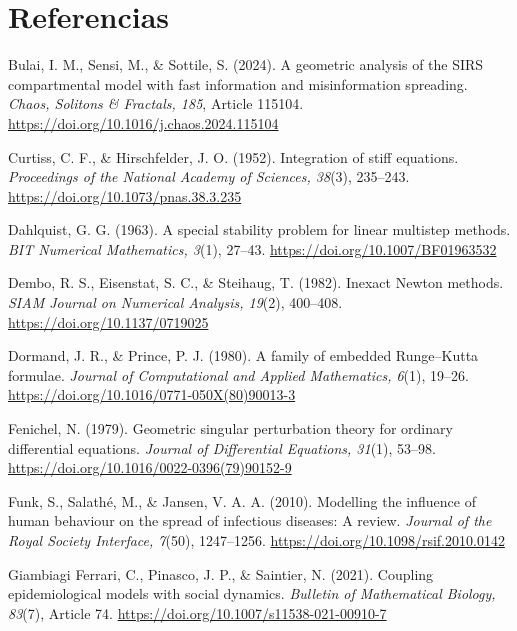 \section*{Referencias}

\begin{flushleft}
\setlength{\parindent}{0pt}
\hangindent=1.27cm
Bulai, I. M., Sensi, M., \& Sottile, S. (2024). A geometric analysis of the SIRS compartmental model with fast information and misinformation spreading. \textit{Chaos, Solitons \& Fractals, 185}, Article 115104. \url{https://doi.org/10.1016/j.chaos.2024.115104}

\hangindent=1.27cm
Curtiss, C. F., \& Hirschfelder, J. O. (1952). Integration of stiff equations. \textit{Proceedings of the National Academy of Sciences, 38}(3), 235--243. \url{https://doi.org/10.1073/pnas.38.3.235}

\hangindent=1.27cm
Dahlquist, G. G. (1963). A special stability problem for linear multistep methods. \textit{BIT Numerical Mathematics, 3}(1), 27--43. \url{https://doi.org/10.1007/BF01963532}

\hangindent=1.27cm
Dembo, R. S., Eisenstat, S. C., \& Steihaug, T. (1982). Inexact Newton methods. \textit{SIAM Journal on Numerical Analysis, 19}(2), 400--408. \url{https://doi.org/10.1137/0719025}

\hangindent=1.27cm
Dormand, J. R., \& Prince, P. J. (1980). A family of embedded Runge--Kutta formulae. \textit{Journal of Computational and Applied Mathematics, 6}(1), 19--26. \url{https://doi.org/10.1016/0771-050X(80)90013-3}

\hangindent=1.27cm
Fenichel, N. (1979). Geometric singular perturbation theory for ordinary differential equations. \textit{Journal of Differential Equations, 31}(1), 53--98. \url{https://doi.org/10.1016/0022-0396(79)90152-9}

\hangindent=1.27cm
Funk, S., Salath\'e, M., \& Jansen, V. A. A. (2010). Modelling the influence of human behaviour on the spread of infectious diseases: A review. \textit{Journal of the Royal Society Interface, 7}(50), 1247--1256. \url{https://doi.org/10.1098/rsif.2010.0142}

\hangindent=1.27cm
Giambiagi Ferrari, C., Pinasco, J. P., \& Saintier, N. (2021). Coupling epidemiological models with social dynamics. \textit{Bulletin of Mathematical Biology, 83}(7), Article 74. \url{https://doi.org/10.1007/s11538-021-00910-7}


\end{flushleft}
